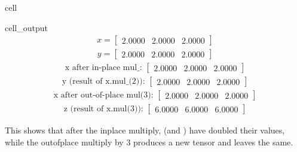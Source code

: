 \documentclass[letterpaper,10pt,english]{jupyterBook}
\begin{document}
\begin{sphinxuseclass}{cell}
\begin{sphinxVerbatimOutput}
\begin{sphinxuseclass}{cell_output}\begin{equation*}
\begin{split}\displaystyle x=\left[
\begin{array}{}
  2.0000 &  2.0000 &  2.0000
\end{array}
\right]\end{split}
\end{equation*}\begin{equation*}
\begin{split}\displaystyle y=\left[
\begin{array}{}
  2.0000 &  2.0000 &  2.0000
\end{array}
\right]\end{split}
\end{equation*}\begin{equation*}
\begin{split}\displaystyle \text{x after in-place mul\_: }\left[
\begin{array}{}
  2.0000 &  2.0000 &  2.0000
\end{array}
\right]\end{split}
\end{equation*}\begin{equation*}
\begin{split}\displaystyle \text{y (result of x.mul\_(2)): }\left[
\begin{array}{}
  2.0000 &  2.0000 &  2.0000
\end{array}
\right]\end{split}
\end{equation*}\begin{equation*}
\begin{split}\displaystyle \text{x after out-of-place mul(3): }\left[
\begin{array}{}
  2.0000 &  2.0000 &  2.0000
\end{array}
\right]\end{split}
\end{equation*}\begin{equation*}
\begin{split}\displaystyle \text{z (result of x.mul(3)): }\left[
\begin{array}{}
  6.0000 &  6.0000 &  6.0000
\end{array}
\right]\end{split}
\end{equation*}
\end{sphinxuseclass}\end{sphinxVerbatimOutput}

\end{sphinxuseclass}
\sphinxAtStartPar
This shows that after the in\sphinxhyphen{}place multiply,  (and ) have doubled their values, while the out\sphinxhyphen{}of\sphinxhyphen{}place multiply by 3 produces a new tensor  and leaves  the same.
\end{document}
